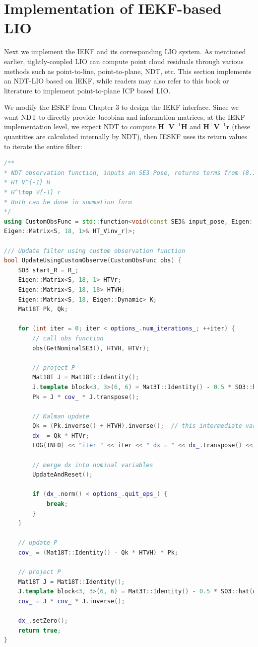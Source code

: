 \section{Implementation of IEKF-based LIO}
\label{sec:iekf-lio}

Next we implement the IEKF and its corresponding LIO system. As mentioned earlier, tightly-coupled LIO can compute point cloud residuals through various methods such as point-to-line, point-to-plane, NDT, etc. This section implements an NDT-LIO based on IEKF, while readers may also refer to this book or literature \cite{Bai2022,Xu2021,xu2021fast} to implement point-to-plane ICP based LIO.

We modify the ESKF from Chapter 3 to design the IEKF interface. Since we want NDT to directly provide Jacobian and information matrices, at the IEKF implementation level, we expect NDT to compute $\bm{H}^\top \bm{V}^{-1} \bm{H}$ and $\bm{H}^\top \bm{V}^{-1} \bm{r}$ (these quantities are calculated internally by NDT), then IESKF uses its return values to iterate the entire filter:

\begin{lstlisting}[language=c++,caption=src/ch8/lio-iekf/iekf.hpp]
/**
* NDT observation function, inputs an SE3 Pose, returns terms from (8.10)
* HT V^{-1} H
* H^\top V{-1} r
* Both can be done in summation form
*/
using CustomObsFunc = std::function<void(const SE3& input_pose, Eigen::Matrix<S, 18, 18>& HT_Vinv_H,
Eigen::Matrix<S, 18, 1>& HT_Vinv_r)>;

/// Update filter using custom observation function
bool UpdateUsingCustomObserve(CustomObsFunc obs) {
	SO3 start_R = R_;
	Eigen::Matrix<S, 18, 1> HTVr;
	Eigen::Matrix<S, 18, 18> HTVH;
	Eigen::Matrix<S, 18, Eigen::Dynamic> K;
	Mat18T Pk, Qk;
	
	for (int iter = 0; iter < options_.num_iterations_; ++iter) {
		// call obs function
		obs(GetNominalSE3(), HTVH, HTVr);
		
		// project P
		Mat18T J = Mat18T::Identity();
		J.template block<3, 3>(6, 6) = Mat3T::Identity() - 0.5 * SO3::hat((R_.inverse() * start_R).log());
		Pk = J * cov_ * J.transpose();
		
		// Kalman update
		Qk = (Pk.inverse() + HTVH).inverse();  // this intermediate variable can be used in final update
		dx_ = Qk * HTVr;
		LOG(INFO) << "iter " << iter << " dx = " << dx_.transpose() << ", dxn: " << dx_.norm();
		
		// merge dx into nominal variables
		UpdateAndReset();
		
		if (dx_.norm() < options_.quit_eps_) {
			break;
		}
	}
	
	// update P
	cov_ = (Mat18T::Identity() - Qk * HTVH) * Pk;
	
	// project P
	Mat18T J = Mat18T::Identity();
	J.template block<3, 3>(6, 6) = Mat3T::Identity() - 0.5 * SO3::hat(dx_.template block<3, 1>(6, 0));
	cov_ = J * cov_ * J.inverse();
	
	dx_.setZero();
	return true;
}
\end{lstlisting}


